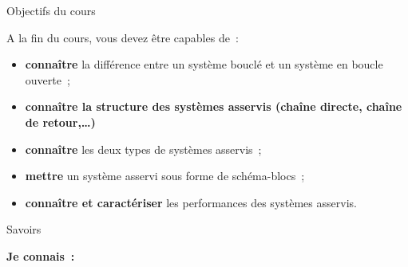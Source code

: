 Objectifs du cours

A la fin du cours, vous devez être capables de~:

\begin{itemize}
\item
  \textbf{connaître} la différence entre un système bouclé et un système
  en boucle ouverte~;
\item
  \textbf{connaître la structure des systèmes asservis (chaîne directe,
  chaîne de retour,\ldots)}
\item
  \textbf{connaître} les deux types de systèmes asservis~;
\item
  \textbf{mettre} un système asservi sous forme de schéma-blocs~;
\item
  \textbf{connaître et caractériser} les performances des systèmes
  asservis.
\end{itemize}

Savoirs

\textbf{Je connais~:}

